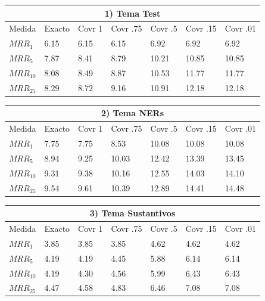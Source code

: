 \begin{table}
\centering
\begin{center}
\begin{tabular}{|l | l | l | l | l | l | l |}
\hline
\multicolumn{7}{|c|}{1) Tema Test}  \\ \hline
Medida & Exacto & Covr 1 & Covr .75 & Covr .5 & Covr .15 & Covr .01 \\ \hline
$MRR_{1}$ & 6.15 & 6.15 & 6.15 & 6.92 & 6.92 & 6.92  \\ \hline
$MRR_{5}$ & 7.87 & 8.41 & 8.79 & 10.21 & 10.85 & 10.85  \\ \hline
$MRR_{10}$ & 8.08 & 8.49 & 8.87 & 10.53 & 11.77 & 11.77  \\ \hline
$MRR_{25}$ & 8.29 & 8.72 & 9.16 & 10.91 & 12.18 & 12.18  \\ \hline
\end{tabular}

\medskip

\begin{tabular}{|l | l | l | l | l | l | l |}
\hline
\multicolumn{7}{|c|}{2) Tema NERs}  \\ \hline
Medida & Exacto & Covr 1 & Covr .75 & Covr .5 & Covr .15 & Covr .01 \\ \hline
$MRR_{1}$ & 7.75 & 7.75 & 8.53 & 10.08 & 10.08 & 10.08  \\ \hline
$MRR_{5}$ & 8.94 & 9.25 & 10.03 & 12.42 & 13.39 & 13.45  \\ \hline
$MRR_{10}$ & 9.31 & 9.38 & 10.16 & 12.55 & 14.03 & 14.10  \\ \hline
$MRR_{25}$ & 9.54 & 9.61 & 10.39 & 12.89 & 14.41 & 14.48  \\ \hline
\end{tabular}

\medskip


\begin{tabular}{|l | l | l | l | l | l | l |}
\hline
\multicolumn{7}{|c|}{3) Tema Sustantivos}  \\ \hline
Medida & Exacto & Covr 1 & Covr .75 & Covr .5 & Covr .15 & Covr .01 \\ \hline
$MRR_{1}$ & 3.85 & 3.85 & 3.85 & 4.62 & 4.62 & 4.62  \\ \hline
$MRR_{5}$ & 4.19 & 4.19 & 4.45 & 5.88 & 6.14 & 6.14  \\ \hline
$MRR_{10}$ & 4.19 & 4.30 & 4.56 & 5.99 & 6.43 & 6.43  \\ \hline
$MRR_{25}$ & 4.47 & 4.58 & 4.83 & 6.46 & 7.08 & 7.08  \\ \hline
\end{tabular}


\end{center}
\end{table}
